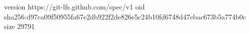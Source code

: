 version https://git-lfs.github.com/spec/v1
oid sha256:d97ca09f50955fa67e2db922f2de826e5c24b10fd6748d47ebac673b5a774b0c
size 29791
